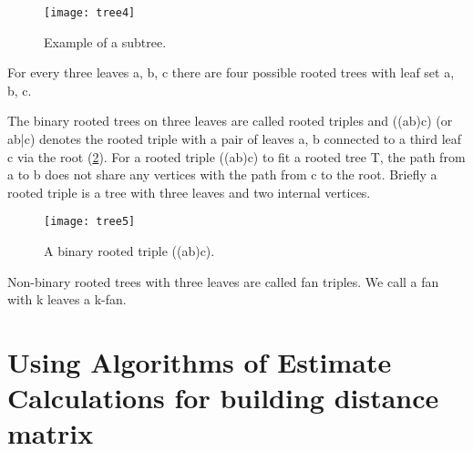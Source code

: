 \begin{figure}[!htbp] 
  \center
  \texttt{[image: tree4]}
  \caption[w]{Example of a subtree.} 
  \label{img:sample4}  
\end{figure} 

For every three leaves a, b, c there are four possible rooted trees 
with leaf set a, b, c.  

The binary rooted trees on three leaves are called rooted triples and 
((ab)c) (or ab|c) denotes the rooted triple with a pair of leaves a, b 
connected to a third leaf c via the root (\ref{img:sample5}). For a rooted triple 
((ab)c) to fit a rooted tree T, the path from a to b does not share any 
vertices with the path from c to the root. Briefly a rooted triple is a tree 
with three leaves and two internal vertices. 

\begin{figure}[!htbp] 
  \center
  \texttt{[image: tree5]}
  \caption[w]{ A binary rooted triple ((ab)c).} 
  \label{img:sample5}  
\end{figure} 

Non-binary rooted trees with three leaves are called fan triples. We 
call a fan with k leaves a k-fan. 


\section{Using Algorithms of Estimate Calculations for building distance matrix}
